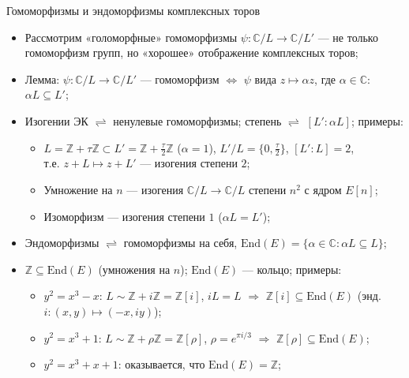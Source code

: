 \documentclass[serif, aspectratio=169]{beamer}
\begin{document}
\begin{frame}{Гомоморфизмы и эндоморфизмы комплексных торов}
    \begin{itemize}
        \item Рассмотрим «голоморфные» гомоморфизмы $\psi:\mathbb{C}/L\to \mathbb{C}/L'$ --- не только гомоморфизм групп, но «хорошее» отображение комплексных торов;
        \item Лемма: $\psi:\mathbb{C}/L\to \mathbb{C}/L'$ --- гомоморфизм $\Leftrightarrow$ $\psi$ вида $z\mapsto \alpha z$, где $\alpha\in\mathbb{C}$: $\alpha L \subseteq L'$;
        \item Изогении ЭК $\rightleftharpoons$ ненулевые гомоморфизмы; степень $\rightleftharpoons$ $[L':\alpha L]$; примеры:
        \begin{itemize}
            \item $L=\mathbb{Z}+\tau\mathbb{Z}\subset L'=\mathbb{Z}+\frac{\tau}{2}\mathbb{Z}$ ($\alpha=1$), $L'/L=\{0,\frac{\tau}{2}\}$, $[L':L]=2$,\\ т.е. $z+L\mapsto z+L'$ --- изогения степени $2$;
            \item Умножение на $n$ --- изогения $\mathbb{C}/L\to \mathbb{C}/L$ степени $n^2$ с ядром $E[n]$;
            \item Изоморфизм --- изогения степени $1$ ($\alpha L= L'$);
        \end{itemize}
        
        \item Эндоморфизмы $\rightleftharpoons$ гомоморфизмы на себя, $\mathrm{End}(E)=\{\alpha\in\mathbb{C}:\alpha L\subseteq L\}$;
        \item $\mathbb{Z}\subseteq\mathrm{End}(E)$ (умножения на $n$); $\mathrm{End}(E)$ --- кольцо; примеры:
        \begin{itemize}
            \item $y^2=x^3-x$: $L\sim\mathbb{Z}+i\mathbb{Z}=\mathbb{Z}[i]$, $i L= L$ $\Rightarrow$ $\mathbb{Z}[i]\subseteq\mathrm{End}(E)$ (энд. $i: (x,y)\mapsto (-x,iy)$);
            \item $y^2=x^3+1$: $L\sim\mathbb{Z}+\rho\mathbb{Z}=\mathbb{Z}[\rho]$, $\rho=e^{\pi i/3}$ $\Rightarrow$ $\mathbb{Z}[\rho]\subseteq\mathrm{End}(E)$;
            \item $y^2=x^3+x+1$: оказывается, что $\mathrm{End}(E)=\mathbb{Z}$;
        \end{itemize}
    \end{itemize}
    \note{
        \begin{itemize}
            \item ---
        \end{itemize}
    }
\end{frame}
\end{document}
